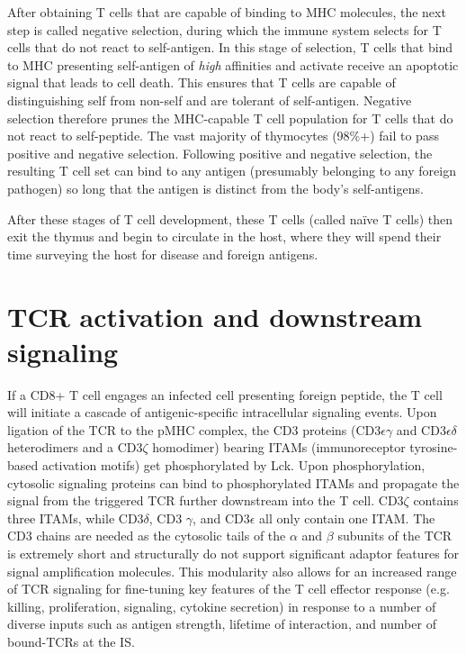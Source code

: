 After obtaining T cells that are capable of binding to MHC molecules, the next step is called negative selection, during which the immune system selects for T cells that do not react to self-antigen. In this stage of selection, T cells that bind to MHC presenting self-antigen of \textit{high} affinities and activate receive an apoptotic signal that leads to cell death. This ensures that T cells are capable of distinguishing self from non-self and are tolerant of self-antigen. Negative selection therefore prunes the MHC-capable T cell population for T cells that do not react to self-peptide. The vast majority of thymocytes (98\%+) fail to pass positive and negative selection. Following positive and negative selection, the resulting T cell set can bind to any antigen (presumably belonging to any foreign pathogen) so long that the antigen is distinct from the body’s self-antigens. 

After these stages of T cell development, these T cells (called naïve T cells) then exit the thymus and begin to circulate in the host, where they will spend their time surveying the host for disease and foreign antigens.

\section{TCR activation and downstream signaling}
	\label{TCR activation and downstream signaling}
If a CD8+ T cell engages an infected cell presenting foreign peptide, the T cell will initiate a cascade of antigenic-specific intracellular signaling events. Upon ligation of the TCR to the pMHC complex, the CD3 proteins (CD3$\epsilon \gamma$ and CD3$\epsilon \delta$ heterodimers and a CD3$\zeta$ homodimer) bearing ITAMs (immunoreceptor tyrosine-based activation motifs) get phosphorylated by Lck. Upon phosphorylation, cytosolic signaling proteins can bind to phosphorylated ITAMs and propagate the signal from the triggered TCR further downstream into the T cell. CD3$\zeta$ contains three ITAMs, while CD3$\delta$, CD3 $\gamma$, and CD3$\epsilon$ all only contain one ITAM. The CD3 chains are needed as the cytosolic tails of the $\alpha$ and $\beta$ subunits of the TCR is extremely short and structurally do not support significant adaptor features for signal amplification molecules. This modularity also allows for an increased range of TCR signaling for fine-tuning key features of the T cell effector response (e.g. killing, proliferation, signaling, cytokine secretion) in response to a number of diverse inputs such as antigen strength, lifetime of interaction, and number of bound-TCRs at the IS.

